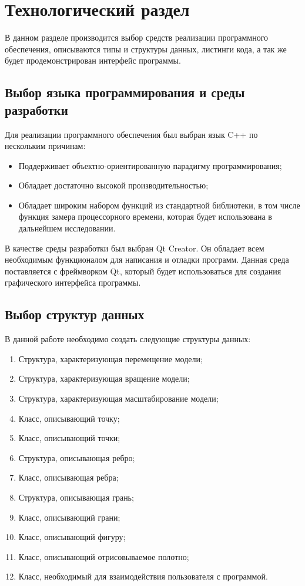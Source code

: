 \chapter{Технологический раздел}
В данном разделе производится выбор средств реализации программного обеспечения, описываются типы и структуры данных, листинги кода, а так же будет продемонстрирован интерфейс программы.

\section{Выбор языка программирования и среды разработки}

Для реализации программного обеспечения был выбран язык C++ по нескольким причинам:
\begin{itemize}
	\item Поддерживает объектно-ориентированную парадигму программирования;
	\item Обладает достаточно высокой производительностью;
	\item Обладает широким набором функций из стандартной библиотеки, в том числе функция замера процессорного времени, которая будет использована в дальнейшем исследовании.
\end{itemize}

В качестве среды разработки был выбран Qt Creator. Он обладает всем необходимым функционалом для написания и отладки программ. Данная среда поставляется с фреймворком Qt, который будет использоваться для создания графического интерфейса программы.


\section{Выбор структур данных}
В данной работе необходимо создать следующие структуры данных:

\begin{enumerate}
	\item Структура, характеризующая перемещение модели;
	\item Структура, характеризующая вращение модели;
	\item Структура, характеризующая масштабирование модели;
	\item Класс, описывающий точку;
	\item Класс, описывающий точки;
	\item Структура, описывающая ребро;
	\item Класс, описывающая ребра;
	\item Структура, описывающая грань;
	\item Класс, описывающий грани;
	\item Класс, описывающий фигуру;
	\item Класс, описывающий отрисовываемое полотно;
	\item Класс, необходимый для взаимодействия пользователя с программой.
\end{enumerate}


